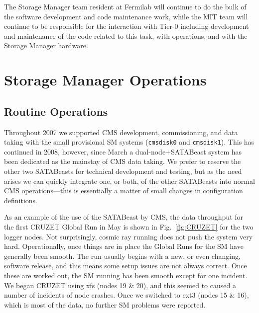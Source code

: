 The Storage Manager team resident at Fermilab will continue to do the bulk of the
software development and code maintenance work, while the MIT team will continue to
be responsible for the interaction with Tier-0 including development and maintenance of
the code related to this task, with operations, and with the
Storage Manager hardware.





\section{Storage Manager Operations}

\subsection{Routine Operations \label{sec:SMexperience}}


Throughout 2007 we supported CMS development, commissioning, and data taking
with the small provisional SM systems (\verb+cmsdisk0+ and \verb+cmsdisk1+).
This has continued in 2008, however,
since March a dual-node$+$SATABeast system has been dedicated
as the mainstay of CMS data taking.
We prefer to reserve the other two SATABeasts for technical development
and testing, but as the need arises we can quickly integrate one, or both,
of the other SATABeasts into normal CMS operations---this is essentially a matter
of small changes in configuration definitions.

As an example of the use of the SATABeast by CMS,
the data throughput for the first CRUZET Global Run in May is shown in Fig.~\ref{fig:CRUZET}
for the two logger nodes.
Not surprisingly, cosmic ray running does not push the system very hard.
Operationally, once things are in place the Global Runs for the SM have
generally been smooth.
The run usually begins with a new, or even changing, software release,
and this means some setup issues are not always correct.
Once these are worked out, the SM running has been smooth except for one incident.
We began CRUZET using xfs (nodes 19 \& 20), and this seemed to caused a number
of incidents of node crashes.
Once we switched to ext3 (nodes 15 \& 16), which is most of the data, 
no further SM problems were reported.
 
